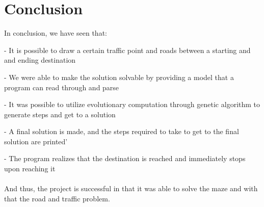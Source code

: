 \documentclass{article}
\begin{document}
\section{Conclusion}
In conclusion, we have seen that:

- It is possible to draw a certain traffic point and roads between a starting and and ending destination

- We were able to make the solution solvable by providing a model that a program can read through and parse

- It was possible to utilize evolutionary computation through genetic algorithm to generate steps and get to a solution

- A final solution is made, and the steps required to take to get to the final solution are printed'

- The program realizes that the destination is reached and immediately stops upon reaching it
\\\\
And thus, the project is successful in that it was able to solve the maze and with that the road and traffic problem.
\end{document}
